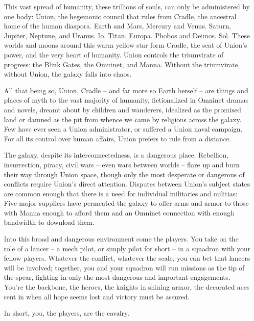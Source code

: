 This vast spread of humanity, these trillions of souls, can only be administered by one body:
Union, the hegemonic council that rules from Cradle, the ancestral home of the human diaspora.
Earth and Mars, Mercury and Venus. Saturn, Jupiter, Neptune, and Uranus. Io. Titan. Europa.
Phobos and Deimos. Sol. These worlds and moons around this warm yellow star form Cradle,
the seat of Union's power, and the very heart of humanity. Union controls the triumvirate of
progress: the Blink Gates, the Omninet, and Manna. Without the triumvirate, without Union, the
galaxy falls into chaos.

All that being so, Union, Cradle -- and far more so Earth herself -- are things and places of myth
to the vast majority of humanity, fictionalized in Omninet dramas and novels, dreamt about by
children and wanderers, idealized as the promised land or damned as the pit from whence we
came by religions across the galaxy. Few have ever seen a Union administrator, or suffered a
Union naval campaign. For all its control over human affairs, Union prefers to rule from a
distance.

The galaxy, despite its interconnectedness, is a dangerous place. Rebellion, insurrection, piracy,
civil wars -- even wars between worlds -- flare up and burn their way through Union space,
though only the most desperate or dangerous of conflicts require Union's direct attention.
Disputes between Union's subject states are common enough that there is a need for individual
militaries and militias: Five major suppliers have permeated the galaxy to offer arms and armor to
those with Manna enough to afford them and an Omninet connection with enough bandwidth to
download them.

Into this broad and dangerous environment come the players. You take on the role of a lancer --
a mech pilot, or simply pilot for short -- in a squadron with your fellow players. Whatever the
conflict, whatever the scale, you can bet that lancers will be involved; together, you and your
squadron will run missions as the tip of the spear, fighting in only the most dangerous and
important engagements. You're the backbone, the heroes, the knights in shining armor, the
decorated aces sent in when all hope seems lost and victory must be assured.

In short, you, the players, are the cavalry.